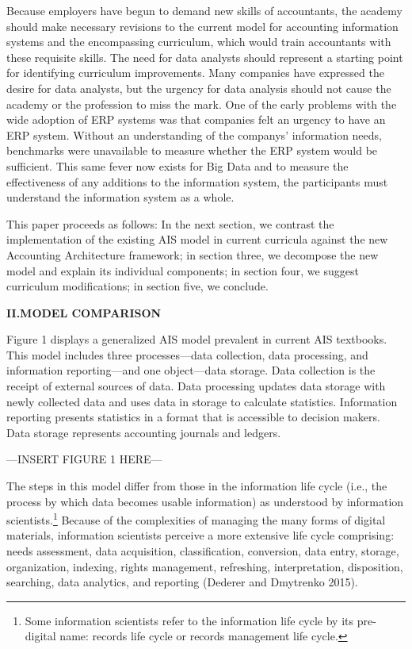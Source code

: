 \documentclass[12pt]{article}
\newcommand{\Section}[2]{\vspace{.2in}\centerline{\normalsize{}\textbf{#1\quad{}\MakeUppercase{#2}}}\nopagebreak{}\smallskip{}\indent{}}
\newcommand{\InsertGraphic}[1]{\vspace{.1in}\noindent{}\centerline{\MakeUppercase{---\quad{}Insert #1 here\quad{}---}}\vspace{.1in}}
\begin{document}
Because employers have begun to demand new skills of accountants, the academy should make necessary revisions to the current model for accounting information systems and the encompassing curriculum, which would train accountants with these requisite skills. The need for data analysts should represent a starting point for identifying curriculum improvements. Many companies have expressed the desire for data analysts, but the urgency for data analysis should not cause the academy or the profession to miss the mark. One of the early problems with the wide adoption of ERP systems was that companies felt an urgency to have an ERP system. Without an understanding of the companys' information needs, benchmarks were unavailable to measure whether the ERP system would be sufficient. This same fever now exists for Big Data and to measure the effectiveness of any additions to the information system, the participants must understand the information system as a whole.

This paper proceeds as follows: In the next section, we contrast the implementation of the existing AIS model in current curricula against the new Accounting Architecture framework; in section three, we decompose the new model and explain its individual components; in section four, we suggest curriculum modifications; in section five, we conclude.

\Section{II.}{Model Comparison}
Figure 1 displays a generalized AIS model prevalent in current AIS textbooks. This model includes three processes---data collection, data processing, and information reporting---and one object---data storage. Data collection is the receipt of external sources of data. Data processing updates data storage with newly collected data and uses data in storage to calculate statistics. Information reporting presents statistics in a format that is accessible to decision makers. Data storage represents accounting journals and ledgers.

\InsertGraphic{Figure 1}

The steps in this model differ from those in the information life cycle (i.e., the process by which data becomes usable information) as understood by information scientists.\footnote{Some information scientists refer to the information life cycle by its pre-digital name: records life cycle or records management life cycle.} Because of the complexities of managing the many forms of digital materials, information scientists perceive a more extensive life cycle comprising: needs assessment, data acquisition, classification, conversion, data entry, storage, organization, indexing, rights management, refreshing, interpretation, disposition, searching, data analytics, and reporting (Dederer and Dmytrenko 2015).
\end{document}
